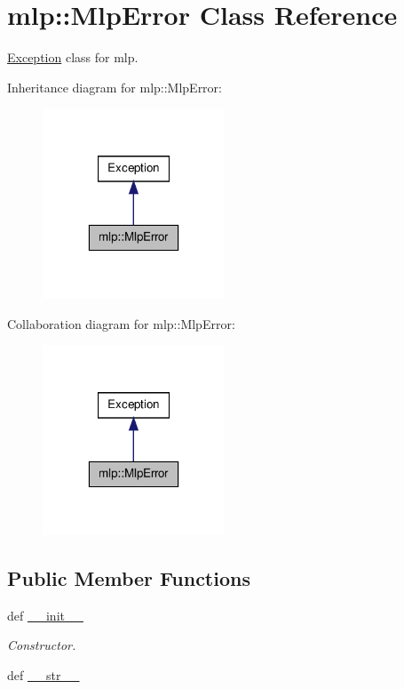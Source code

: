 \hypertarget{classmlp_1_1MlpError}{
\section{mlp::MlpError Class Reference}
\label{classmlp_1_1MlpError}
}


\hyperlink{classException}{Exception} class for mlp.  




Inheritance diagram for mlp::MlpError:\nopagebreak
\begin{figure}[H]
\begin{center}
\leavevmode
\includegraphics[width=154pt]{classmlp_1_1MlpError__inherit__graph}
\end{center}
\end{figure}


Collaboration diagram for mlp::MlpError:\nopagebreak
\begin{figure}[H]
\begin{center}
\leavevmode
\includegraphics[width=154pt]{classmlp_1_1MlpError__coll__graph}
\end{center}
\end{figure}
\subsection*{Public Member Functions}
\begin{DoxyCompactItemize}
\item 
def \hyperlink{classmlp_1_1MlpError_a7d524593f7cdd8e23b91eba473fa9b58}{\_\-\_\-init\_\-\_\-}
\begin{DoxyCompactList}\small\item\em Constructor. \item\end{DoxyCompactList}\item 
def \hyperlink{classmlp_1_1MlpError_a660e2a1c32bf1ea08a1dcd0e123eb0be}{\_\-\_\-str\_\-\_\-}
\end{DoxyCompactItemize}
